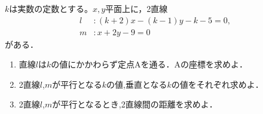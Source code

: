\documentclass[8pt,dvipdfmx]{article}[b5paper]
\begin{document}
\begin{tcolorbox}[title=数学\textcircled{1} 4- 2 AB]
$k$は実数の定数とする。\(x, y\)平面上に，2直線
\begin{align*}
l&:(k+2)x -(k-1)y -k -5 =0,\\
m&:x+2y-9=0
\end{align*}
がある．
\begin{enumerate}[(1)]
    \item 直線$l$は$k$の値にかかわらず定点Aを通る．Aの座標を求めよ．
    \item 2直線$l$,$m$が平行となる$k$の値,垂直となる$k$の値をそれぞれ求めよ．
    \item2直線$l$,$m$が平行となるとき,2直線間の距離を求めよ．
\end{enumerate}
\end{tcolorbox}
\end{document}
